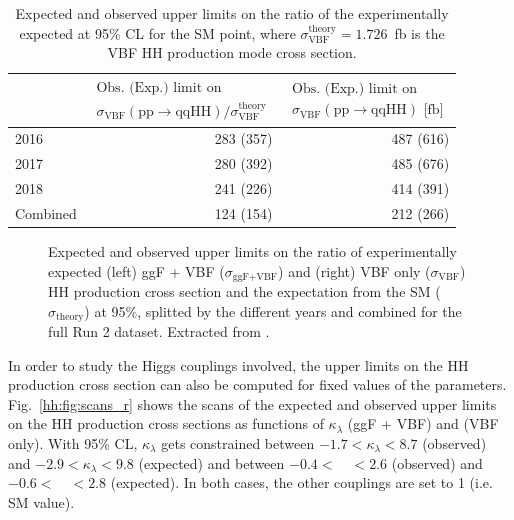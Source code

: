 \documentclass[../main.tex]{subfiles}
\begin{document}
\begin{table}[h!]
\begin{center}
\begin{tabular}{l | r | r}
& 
$
\begin{matrix}
\text{Obs. (Exp.) limit on } \\ \sigma_{\text{VBF}}(\text{pp}\to\text{qqHH})/ \sigma_{\text{VBF}}^{\text{theory}} 
\end{matrix}
$
& 
$
\begin{matrix}
\text{Obs. (Exp.) limit on } \\ \sigma_{\text{VBF}}(\text{pp}\to\text{qqHH}) \text{~[fb]}
\end{matrix}
$ \\ \hline
2016 &     283 (357) & 487 (616) \\
2017 &     280 (392) & 485 (676) \\
2018 &     241 (226) & 414 (391) \\
Combined & 124 (154) & 212 (266)
\end{tabular}
\end{center}
\caption[Upper limits on the HH VBF-only production cross section]{Expected and observed upper limits on the ratio of the experimentally expected  at 95\% CL for the SM point, where $\sigma_{\text{VBF}}^{\text{theory}}=1.726$~fb is the VBF HH production mode cross section.}
\label{hh:tab:limit_rvbf}
\end{table}


\begin{figure}[h!]
\begin{center}
\end{center}
\caption[Upper limits on the inclusive and VBF-only production cross sections]{Expected and observed upper limits on the ratio of experimentally expected (left) ggF + VBF ($\sigma_{\text{ggF+VBF}}$) and (right) VBF only ($\sigma_{\text{VBF}}$) HH production cross section and the expectation from the SM ($\sigma_\text{theory}$) at 95\%, splitted by the different years and combined for the full Run 2 dataset. Extracted from \cite{hh:analysis:run2}.}
\label{hh:fig:limits_r}
\end{figure}

In order to study the Higgs couplings involved, the upper limits on the HH production cross section can also be computed for fixed values of the parameters. Fig.~\ref{hh:fig:scans_r} shows the scans of the expected and observed upper limits on the HH production cross sections as functions of $\kappa_\lambda$ (ggF + VBF) and \kvv{} (VBF only). With 95\% CL, $\kappa_\lambda$ gets constrained between $ -1.7 <\kappa_\lambda < 8.7$ (observed) and $-2.9 < \kappa_\lambda < 9.8$ (expected) and \kvv{} between $-0.4 <$~\kvv{}~$< 2.6$ (observed) and $-0.6<$~\kvv{}~$<  2.8$ (expected). In both cases, the other couplings are set to 1 (i.e. SM value).
\end{document}
